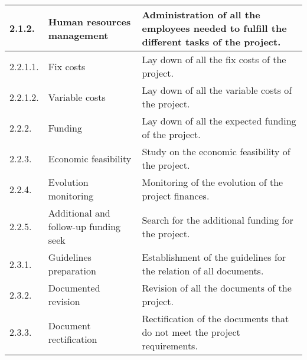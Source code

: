 \begin{longtable}[H]{l >{\raggedright\arraybackslash}p{4cm} p{8cm}}
	2.1.2. & Human resources management & Administration of all the employees needed to fulfill the different tasks of the project.\vspace{0.2cm} \\
	
	\midrule
	
	2.2.1.1. & Fix costs & Lay down of all the fix costs of the project.\vspace{0.2cm} \\
	
	\midrule
	
	2.2.1.2. & Variable costs & Lay down of all the variable costs of the project.\vspace{0.2cm} \\
	
	\midrule
	
	2.2.2. & Funding & Lay down of all the expected funding of the project.\vspace{0.2cm} \\
	
	\midrule
	
	2.2.3. & Economic feasibility & Study on the economic feasibility of the project.\vspace{0.2cm} \\
	
	\midrule
	
	2.2.4. & Evolution monitoring & Monitoring of the evolution of the project finances.\vspace{0.2cm} \\
	
	\midrule
	
	2.2.5. & Additional and follow-up funding seek & Search for the additional funding for the project.\vspace{0.2cm} \\
	
	\midrule
	
	2.3.1. & Guidelines preparation & Establishment of the guidelines for the relation of all documents.\vspace{0.2cm} \\
	
	\midrule
	
	2.3.2. & Documented revision & Revision of all the documents of the project.\vspace{0.2cm} \\
	
	\midrule
	
	2.3.3. & Document rectification & Rectification of the documents that do not meet the project requirements.\vspace{0.2cm} \\
	

\end{longtable}
